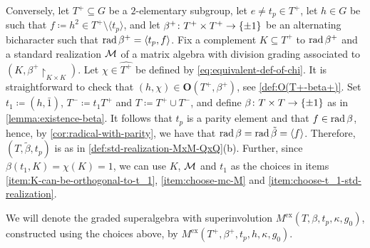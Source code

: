 Conversely, let $T^+ \subseteq G$ be a $2$-elementary subgroup, let $e\neq t_p \in T^+$, let $h \in G$ be such that $f \coloneqq h^2 \in T^+ \setminus \langle t_p \rangle$, and let $\beta^+\colon T^+ \times T^+ \to \{ \pm 1 \}$ be an alternating bicharacter such that $\operatorname{rad} \beta^+ = \langle t_p, f \rangle$. 
Fix a complement $K \subseteq T^+$ to $\operatorname{rad} \beta^+$ and a standard realization $\mathcal M$ of a matrix algebra with division grading associated to $(K, \beta^+\restriction_{K \times K})$. 
Let $\chi \in \widehat{T^+}$ be defined by \cref{eq:equivalent-def-of-chi}. 
It is straightforward to check that $(h, \chi) \in \mathbf{O} (T^+, \beta^+)$, see \cref{def:O(T+-beta+)}. 
Set $t_1 \coloneqq (h, \bar 1)$, $T^- \coloneqq t_1 T^+$ and $T \coloneqq T^+ \cup T^-$, and define $\beta\colon T\times T\to \{ \pm 1 \}$ as in \cref{lemma:existence-beta}. 
It follows that $t_p$ is a parity element and that $f\in \operatorname{rad} \beta$, hence, by \cref{cor:radical-with-parity}, we have that $\operatorname{rad} \beta = \operatorname{rad} \tilde\beta = \langle f \rangle$. 
Therefore, $(T, \tilde\beta, t_p)$ is as in \cref{def:std-realization-MxM-QxQ}(b). 
Further, since $\beta(t_1, K) = \chi(K) = 1$, we can use $K$, $\mathcal M$ and $t_1$ as the choices in items 
\eqref{item:K-can-be-orthogonal-to-t_1}, \eqref{item:choose-mc-M} and \eqref{item:choose-t_1-std-realization}. 

We will denote the graded superalgebra with superinvolution $M^{\mathrm{ex}}(T, \beta, t_p, \kappa, g_0)$, constructed using the choices above, by $M^{\mathrm{ex}}(T^+, \beta^+, t_p, h, \kappa, g_0)$. 


